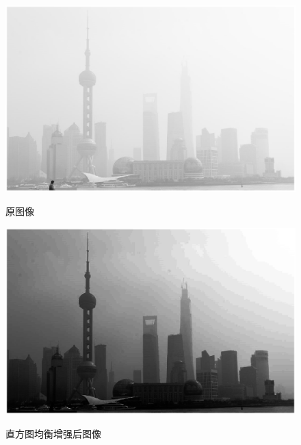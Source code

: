 \documentclass[12pt]{book}
\begin{document}
				\begin{figure}[!ht]
					\begin{minipage}{0.48\linewidth}
						\centerline{\includegraphics[width=1\textwidth]{./figures/originalImage16.eps}}
						\centerline{原图像}
					\end{minipage}
					\qquad
					\begin{minipage}{0.48\linewidth}
						\centerline{\includegraphics[width=1\textwidth]{./figures/HE16.eps}}
						\centerline{直方图均衡增强后图像}
					\end{minipage}


\end{figure}
\end{document}
